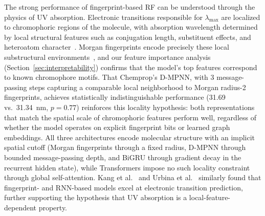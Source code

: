 \documentclass[11pt,a4paper]{article}
\begin{document}
The strong performance of fingerprint-based RF can be understood through the physics of UV absorption.
Electronic transitions responsible for $\lambda_{\max}$ are localized to chromophoric regions of the molecule, with absorption wavelength determined by local structural features such as conjugation length, substituent effects, and heteroatom character~\cite{flemingMolecular2010, reichardt2011solvents}.
Morgan fingerprints encode precisely these local substructural environments~\cite{rogers2010extended}, and our feature importance analysis (Section~\ref{sec:interpretability}) confirms that the model's top features correspond to known chromophore motifs.
That Chemprop's D-MPNN, with 3 message-passing steps capturing a comparable local neighborhood to Morgan radius-2 fingerprints, achieves statistically indistinguishable performance (31.69 vs.\ 31.34~nm, $p = 0.77$) reinforces this locality hypothesis: both representations that match the spatial scale of chromophoric features perform well, regardless of whether the model operates on explicit fingerprint bits or learned graph embeddings.
All three architectures encode molecular structure with an implicit spatial cutoff (Morgan fingerprints through a fixed radius, D-MPNN through bounded message-passing depth, and BiGRU through gradient decay in the recurrent hidden state), while Transformers impose no such locality constraint through global self-attention.
Kang et al.~\cite{kang2020prediction} and Urbina et al.~\cite{beard2022uvadvisor} similarly found that fingerprint- and RNN-based models excel at electronic transition prediction, further supporting the hypothesis that UV absorption is a local-feature-dependent property.
\end{document}
